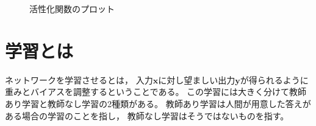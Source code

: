 \documentclass[class=jsarticle, crop=false, dvipdfmx, fleqn]{standalone}
\begin{document}
\begin{figure}
	\centering
	\begin{minipage}{0.45\linewidth}
		\centering
		
		\label{fig:step_function}
	\end{minipage}
	\begin{minipage}{0.45\linewidth}
		\centering
		
		\label{fig:sigmoid_function}
	\end{minipage}
	\begin{minipage}{0.45\linewidth}
		\centering
		
		\label{fig:tanh_function}
	\end{minipage}
	\begin{minipage}{0.45\linewidth}
		\centering
		
		\label{fig:softplus_function}
	\end{minipage}
	\begin{minipage}{0.45\linewidth}
		\centering
		
		\label{fig:relu_function}
	\end{minipage}
	\begin{minipage}{0.45\linewidth}
		\centering
		
		\label{fig:leaky_relu_function}
	\end{minipage}
	\begin{minipage}{0.45\linewidth}
		\centering
		
		\label{fig:elu_function}
	\end{minipage}
	\begin{minipage}{0.45\linewidth}
		\centering
		
		\label{fig:identity_function}
	\end{minipage}
	\caption{活性化関数のプロット}
	\label{fig:plot_of_activate_function}
\end{figure}



\section{学習とは}

ネットワークを学習させるとは，
入力$\bm{x}$に対し望ましい出力$\bm{y}$が得られるように
重みとバイアスを調整するということである。
この学習には大きく分けて教師あり学習と教師なし学習の2種類がある。
教師あり学習は人間が用意した答えがある場合の学習のことを指し，
教師なし学習はそうではないものを指す。
\end{document}
